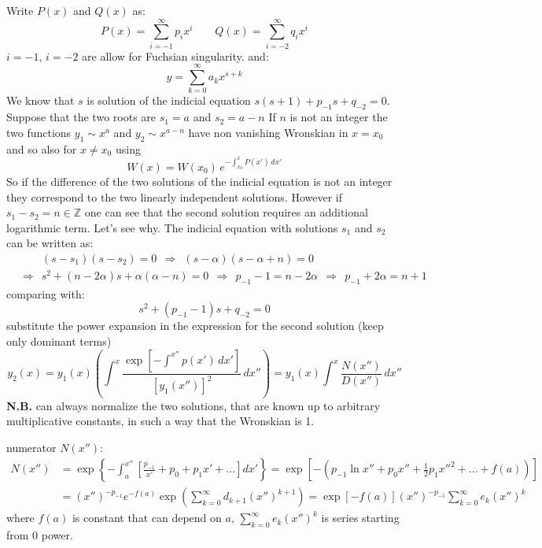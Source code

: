 \documentclass{article}
\begin{document}
\noindent
Write $P(x)$ and $Q(x)$ as:
\begin{equation}
    P(x) = \sum_{i=-1}^{\infty} p_i x^i \qquad 
Q(x) = \sum_{i=-2}^{\infty} q_i x^i
\end{equation}
\noindent
$i=-1$, $i=-2$ are allow for Fuchsian singularity. and:
\begin{equation}
    y = \sum_{k=0}^{\infty} a_k x^{s+k}
\end{equation}
We know that $s$ is solution of the indicial equation $s(s+1) + p_{-1} s + q_{-2} = 0$. Suppose that the two roots are $s_1 = a$ and $s_2 = a - n$ If $n$ is not an integer the two functions $y_1 \sim x^a$ and $y_2 \sim x^{a-n}$ have non vanishing Wronskian in $x = x_0$ and so also for $x \neq x_0 $ using
\begin{equation}
    W(x) = W(x_0) \, e^{-\int_{x_0}^{x} P(x')\,dx'}
\end{equation}
So if the difference of the two solutions of the indicial equation is not an integer they correspond to the two linearly independent solutions. However if $s_1 - s_2 = n \in \mathbb{Z}$ one can see that the second solution requires an additional logarithmic term. Let’s see why. The indicial equation with solutions $s_1$ and $s_2$ can be written as:
\begin{align*}
    & \quad \quad (s - s_1)(s- s_2) = 0 \ \ \Rightarrow \ \ (s - \alpha)(s-\alpha + n) = 0 \\
    & \Rightarrow \ \ s^2 + (n-2\alpha)s+\alpha(\alpha-n)=0 \ \ \Rightarrow \ \ p_{-1} - 1 = n - 2\alpha \ \ \Rightarrow \ \ \boxed{p_{-1} + 2\alpha = n+1}
\end{align*}
comparing with:
\begin{equation}
    s^2 + (p_{-1} - 1)s + q_{-2} = 0
\end{equation}
substitute the power expansion in the expression for the second solution (keep only dominant terms)
\begin{equation}
    y_2(x) = y_1(x) \left( \int^x \frac{\exp\left[ -\int^{{x}''} p(x')\,dx' \right]}{\left[y_1({x}'')\right]^2} \, d{x}'' \right)
= y_1(x) \int^x \frac{N({x}'')}{D({x}'')} \, d{x}''
\end{equation}
\textbf{N.B. }can always normalize the two solutions, that are known up to arbitrary multiplicative constants, in such a way that the Wronskian is 1.

\noindent
numerator $N(x'')$:
\begin{align*}
    N(x'') &= \exp\left\{ 
  - \int_a^{x''} \left[ \frac{p_{-1}}{x'} + p_0 + p_1 x' + \dots \right] dx' 
\right\}
= \exp\left[ 
  - \left( p_{-1} \ln x'' + p_0 x'' + \frac{1}{2} p_1 x''^2 + \dots + f(a) \right)
\right]\\
&= (x'')^{-p_{-1}} e^{-f(a)} 
\exp\left( \sum_{k=0}^{\infty} d_{k+1} (x'')^{k+1} \right)
= \exp\left[ -f(a) \right] (x'')^{-p_{-1}} 
\sum_{k=0}^{\infty} e_k (x'')^k
\end{align*}
where $f(a)$ is constant that can depend on $a$, $\sum_{k=0}^{\infty} e_k (x'')^k$ is series starting from 0 power.
\end{document}
